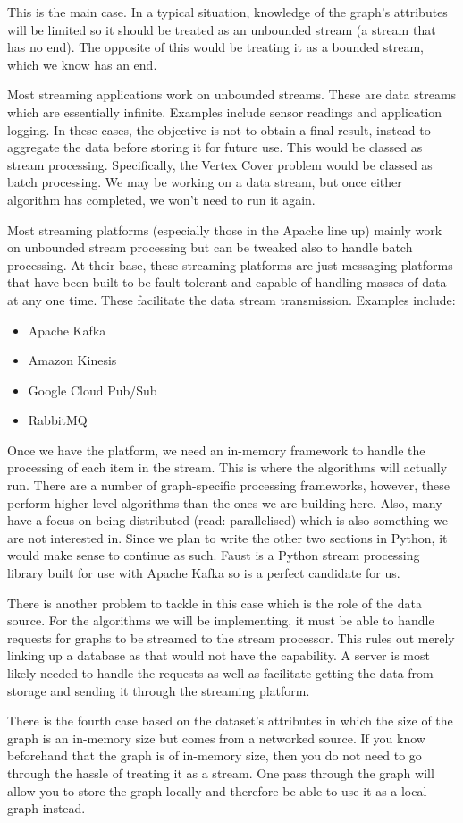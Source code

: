 This is the main case. In a typical situation, knowledge of the graph's
attributes will be limited so it should be treated as an unbounded stream (a
stream that has no end). The opposite of this would be treating it as a bounded
stream, which we know has an end.

Most streaming applications work on unbounded streams. These are data streams
which are essentially infinite. Examples include sensor readings and
application logging. In these cases, the objective is not to obtain a final
result, instead to aggregate the data before storing it for future use. This
would be classed as stream processing. Specifically, the Vertex Cover problem
would be classed as batch processing. We may be working on a data stream, but
once either algorithm has completed, we won't need to run it again.

Most streaming platforms (especially those in the Apache line up) mainly work
on unbounded stream processing but can be tweaked also to handle batch
processing. At their base, these streaming platforms are just messaging
platforms that have been built to be fault-tolerant and capable of handling
masses of data at any one time. These facilitate the data stream transmission.
Examples include:

\begin{itemize}
    \item
          Apache Kafka
    \item
          Amazon Kinesis
    \item
          Google Cloud Pub/Sub
    \item
          RabbitMQ
\end{itemize}

Once we have the platform, we need an in-memory framework to handle the
processing of each item in the stream. This is where the algorithms will
actually run. There are a number of graph-specific processing frameworks,
however, these perform higher-level algorithms than the ones we are building
here. Also, many have a focus on being distributed (read: parallelised) which
is also something we are not interested in. Since we plan to write the other
two sections in Python, it would make sense to continue as such. Faust is a
Python stream processing library built for use with Apache Kafka so is a
perfect candidate for us.

There is another problem to tackle in this case which is the role of the data
source. For the algorithms we will be implementing, it must be able to handle
requests for graphs to be streamed to the stream processor. This rules out
merely linking up a database as that would not have the capability. A server is
most likely needed to handle the requests as well as facilitate getting the
data from storage and sending it through the streaming platform.

There is the fourth case based on the dataset's attributes in which the size of
the graph is an in-memory size but comes from a networked source. If you know
beforehand that the graph is of in-memory size, then you do not need to go
through the hassle of treating it as a stream. One pass through the graph will
allow you to store the graph locally and therefore be able to use it as a local
graph instead.
